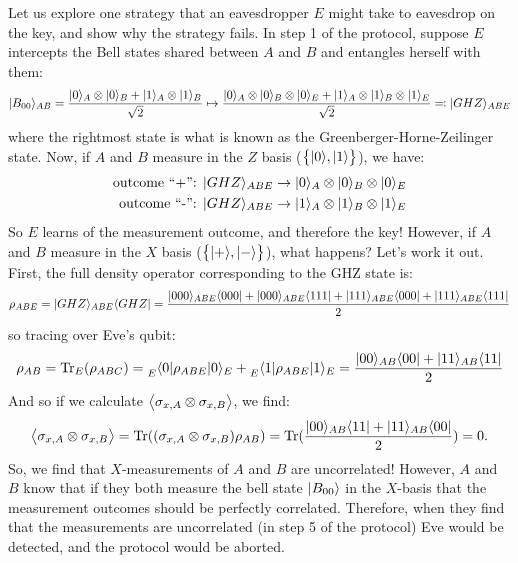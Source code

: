 Let us explore one strategy that an eavesdropper $E$ might take to eavesdrop on the key, and show why the strategy fails. In step 1 of the protocol, suppose $E$ intercepts the Bell states shared between $A$ and $B$ and entangles herself with them:
\begin{equation}
    \lvert B_{00} \rangle_{AB} = \frac{\lvert 0 \rangle_A \otimes \lvert 0 \rangle_B + \lvert 1 \rangle_A \otimes \lvert 1 \rangle_B}{\sqrt{2}} \mapsto \frac{\lvert 0 \rangle_A \otimes \lvert 0 \rangle_B \otimes \lvert 0 \rangle_E + \lvert 1 \rangle_A \otimes \lvert 1 \rangle_B \otimes \lvert 1 \rangle_E}{\sqrt{2}} \eqqcolon \lvert GHZ \rangle_{ABE}
\end{equation}
where the rightmost state is what is known as the Greenberger-Horne-Zeilinger state. Now, if $A$ and $B$ measure in the $Z$ basis ($\set{\lvert 0 \rangle, \lvert 1 \rangle}$), we have:
\begin{equation}
    \begin{split}
        \text{outcome ``+'': } \lvert GHZ \rangle_{ABE} &\to \lvert 0 \rangle_A \otimes \lvert 0 \rangle_B \otimes \lvert 0 \rangle_E
        \\ \text{outcome  ``-'': } \lvert GHZ \rangle_{ABE} &\to \lvert 1 \rangle_A \otimes \lvert 1 \rangle_B \otimes \lvert 1 \rangle_E
    \end{split}
\end{equation}
So $E$ learns of the measurement outcome, and therefore the key! However, if $A$ and $B$ measure in the $X$ basis ($\set{\lvert + \rangle, \lvert - \rangle}$), what happens? Let's work it out. First, the full density operator corresponding to the GHZ state is:
\begin{equation}
    \rho_{ABE} = \lvert GHZ \rangle_{ABE}\langle GHZ \rvert = \frac{\lvert 000 \rangle_{ABE}\langle 000 \rvert + \lvert 000 \rangle_{ABE}\langle 111 \rvert + \lvert 111 \rangle_{ABE}\langle 000 \rvert + \lvert 111 \rangle_{ABE}\langle 111 \rvert}{2}
\end{equation}
so tracing over Eve's qubit:
\begin{equation}
    \rho_{AB} = \mathrm{Tr}_E(\rho_{ABC}) = \prescript{}{E}{\langle 0 \rvert}\rho_{ABE}\lvert 0 \rangle_E + \prescript{}{E}{\langle 1 \rvert}\rho_{ABE}\lvert 1 \rangle_E = \frac{\lvert 00 \rangle_{AB}\langle 00 \rvert + \lvert 11 \rangle_{AB}\langle 11 \rvert}{2}
\end{equation}
And so if we calculate $\left< \sigma_{x, A} \otimes \sigma_{x, B} \right>$, we find:
\begin{equation}
    \left< \sigma_{x, A} \otimes \sigma_{x, B} \right> = \mathrm{Tr}((\sigma_{x, A} \otimes \sigma_{x, B})\rho_{AB}) = \mathrm{Tr}(\frac{\lvert 00 \rangle_{AB}\langle 11 \rvert + \lvert 11 \rangle_{AB}\langle 00 \rvert}{2}) = 0.
\end{equation}
So, we find that $X$-measurements of $A$ and $B$ are uncorrelated! However, $A$ and $B$ know that if they both measure the bell state $\lvert B_{00} \rangle$ in the $X$-basis that the measurement outcomes should be perfectly correlated. Therefore, when they find that the measurements are uncorrelated (in step 5 of the protocol) Eve would be detected, and the protocol would be aborted.

